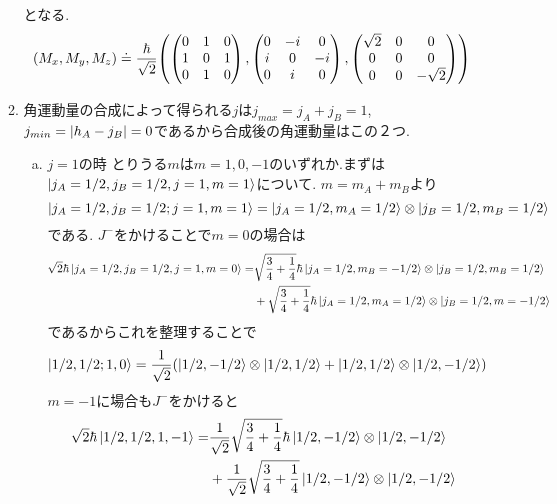 \documentclass[uplatex,dvipdfmx, a4paper,11pt]{jsarticle}
\begin{document}
\begin{enumerate}[1.]
\begin{enumerate}[1）]
\begin{equation}
    \end{equation}
    となる.
    \begin{equation}
        (M_x,M_y,M_z)\doteq\frac{\hbar}{\sqrt{2}}\qty(\begin{pmatrix}
            0&1&0\\1&0&1\\0&1&0
        \end{pmatrix}, \begin{pmatrix}
            0&-i&0\\i&0&-i\\0&i&0
        \end{pmatrix},\begin{pmatrix}
            \sqrt{2}&0&0\\0&0&0\\0&0&-\sqrt{2}
        \end{pmatrix})
    \end{equation}
        \item 角運動量の合成によって得られる$j$は$j_{max}=j_A+j_B=1$, $j_{min}=\abs{h_A-j_B}=0$であるから合成後の角運動量はこの２つ.
        \begin{enumerate}[(a)]
            \item $j=1$の時
                とりうる$m$は$m=1,0,-1$のいずれか.まずは$\ket{j_A=1/2,j_B=1/2,j=1,m=1}$について. $m=m_A+m_B$より
                \begin{equation}
                    \ket{j_A=1/2,j_B=1/2;j=1,m=1}=\ket{j_A=1/2,m_A=1/2}\otimes \ket{j_B=1/2, m_B=1/2}
                \end{equation}
                である. $J^{-}$をかけることで$m=0$の場合は
                \begin{align*}
                    \sqrt{2}\hbar\ket{j_A=1/2,j_B=1/2,j=1,m=0}=&\sqrt{\frac{3}{4}+\frac{1}{4}}\hbar\ket{j_A=1/2,m_B=-1/2}\otimes\ket{j_B=1/2,m_B=1/2}\\
                    &+\sqrt{\frac{3}{4}+\frac{1}{4}}\hbar\ket{j_A=1/2,m_A=1/2}\otimes\ket{j_B=1/2, m=-1/2} 
                \end{align*}
                であるからこれを整理することで
                \begin{equation}
                    \ket{1/2,1/2;1,0}=\frac{1}{\sqrt{2}}\qty(\ket{1/2,-1/2}\otimes \ket{1/2,1/2}+\ket{1/2,1/2}\otimes\ket{1/2,-1/2})
                \end{equation}
                $m=-1$に場合も$J^{-}$をかけると
                \begin{align*}
                    \sqrt{2}\hbar\ket{1/2,1/2,1,-1}=&\frac{1}{\sqrt{2}}\sqrt{\frac{3}{4}+\frac{1}{4}}\hbar\ket{1/2,-1/2}\otimes\ket{1/2,-1/2}\\&+\frac{1}{\sqrt{2}}\sqrt{\frac{3}{4}+\frac{1}{4}}\ket{1/2,-1/2}\otimes\ket{1/2,-1/2}

\end{align*}
\end{enumerate}
\end{enumerate}
\end{enumerate}
\end{document}
